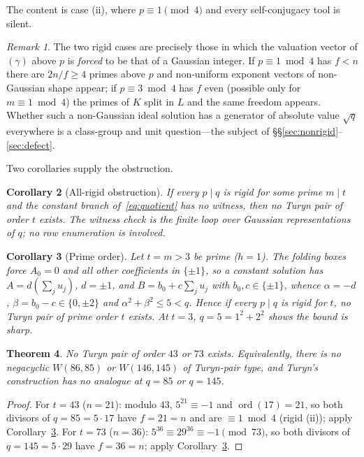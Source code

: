 \documentclass[11pt]{article}
\theoremstyle{plain}
\newtheorem{theorem}{Theorem}[section]
\newtheorem{corollary}[theorem]{Corollary}
\theoremstyle{definition}
\theoremstyle{remark}
\newtheorem{remark}[theorem]{Remark}
\newcommand{\ord}{\operatorname{ord}}
\begin{document}
The content is case (ii), where $p\equiv1\pmod4$ and every self-conjugacy tool
is silent.

\begin{remark}\label{rem:escapes}
The two rigid cases are precisely those in which the valuation vector of
$(\gamma)$ above $p$ is \emph{forced} to be that of a Gaussian integer. If
$p\equiv1\bmod4$ has $f<n$ there are $2n/f\ge4$ primes above $p$ and non-uniform
exponent vectors of non-Gaussian shape appear; if $p\equiv3\bmod4$ has $f$ even
(possible only for $m\equiv1\bmod4$) the primes of $K$ split in $L$ and the same
freedom appears. Whether such a non-Gaussian ideal solution has a generator of
absolute value $\sqrt q$ everywhere is a class-group and unit question---the
subject of \S\S\ref{sec:nonrigid}--\ref{sec:defect}.
\end{remark}

Two corollaries supply the obstruction.

\begin{corollary}[All-rigid obstruction]\label{cor:allrigid}
If every $p\mid q$ is rigid for some prime $m\mid t$ and the constant branch
of~\eqref{eq:quotient} has no witness, then no Turyn pair of order $t$ exists.
The witness check is the finite loop over Gaussian representations of $q$; no
row enumeration is involved.
\end{corollary}

\begin{corollary}[Prime order]\label{cor:primet}
Let $t=m>3$ be prime ($h=1$). The folding boxes force $A_0=0$ and all other
coefficients in $\{\pm1\}$, so a constant solution has $A=d(\sum_j u_j)$,
$d=\pm1$, and $B=b_0+c\sum_j u_j$ with $b_0,c\in\{\pm1\}$, whence $\alpha=-d$,
$\beta=b_0-c\in\{0,\pm2\}$ and $\alpha^2+\beta^2\le5<q$. Hence if every $p\mid q$
is rigid for $t$, no Turyn pair of prime order $t$ exists. At $t=3$,
$q=5=1^2+2^2$ shows the bound is sharp.
\end{corollary}

\begin{theorem}\label{thm:4373}
No Turyn pair of order $43$ or $73$ exists. Equivalently, there is no negacyclic
$W(86,85)$ or $W(146,145)$ of Turyn-pair type, and Turyn's construction has no
analogue at $q=85$ or $q=145$.
\end{theorem}

\begin{proof}
For $t=43$ ($n=21$): modulo $43$, $5^{21}\equiv-1$ and $\ord(17)=21$, so both
divisors of $q=85=5\cdot17$ have $f=21=n$ and are $\equiv1\bmod4$ (rigid (ii));
apply Corollary~\ref{cor:primet}. For $t=73$ ($n=36$): $5^{36}\equiv29^{36}
\equiv-1\pmod{73}$, so both divisors of $q=145=5\cdot29$ have $f=36=n$; apply
Corollary~\ref{cor:primet}.
\end{proof}
\end{document}
